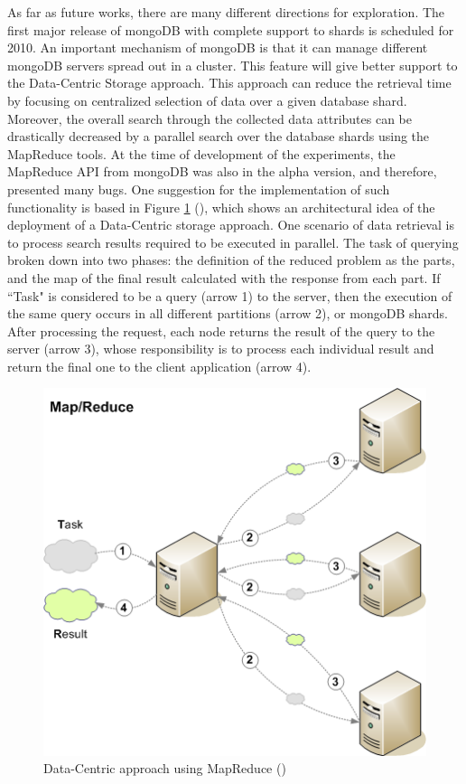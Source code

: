 As far as future works, there are many different directions for exploration.
The first major release of mongoDB with complete support to shards is
scheduled for 2010. An important mechanism of mongoDB is that it can
manage different mongoDB servers spread out in a cluster. This feature will give
better support to the Data-Centric Storage approach. This approach can reduce
the retrieval time by focusing on centralized selection of data over a given
database shard. Moreover, the overall search through the collected data
attributes can be drastically decreased by a parallel search over the database
shards using the MapReduce \cite{map-reduce} tools. At the time of development
of the experiments, the MapReduce API from mongoDB was also in the alpha
version, and therefore, presented many bugs. One suggestion for the
implementation of such functionality is based in Figure
\ref{fig:future-works-data-centric-map-reduce} (\cite{map-reduce-notes}), which
shows an architectural idea of the deployment of a Data-Centric storage
approach. One scenario of data retrieval is to process search results required
to be executed in parallel. The task of querying broken down into two phases:
the definition of the reduced problem as the parts, and the map of the final
result calculated with the response from each part. If ``Task" is considered
to be a query (arrow 1) to the server, then the execution of the same query
occurs in all different partitions (arrow 2), or mongoDB shards. After
processing the request, each node returns the result of the query to the
server (arrow 3), whose responsibility is to process each individual result
and return the final one to the client application (arrow 4).

\begin{figure}[!h]
  \centering
  \includegraphics[scale=0.65]{../diagrams/future-works-data-centric-map-reduce}
  \caption{Data-Centric approach using MapReduce (\cite{map-reduce-notes})}
  \label{fig:future-works-data-centric-map-reduce}
\end{figure}

